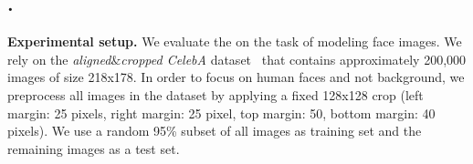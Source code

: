 \begin{table}[t]
        \center
    \caption{The negative log-likelihood of the different models for the CIFAR-10 \textbf{test set}
             measured as bits-per-dimension.}
	\label{table:nll}
\end{table}

\subsection{\PYRAMID.} 

\textbf{Experimental setup.} We evaluate the \PYRAMID on 
the task of modeling face images. We rely on the \emph{aligned$\&$cropped CelebA} 
dataset~\cite{liu2015faceattributes} that contains approximately 
200,000 images of size 218x178.
In order to focus on human faces and not background, we preprocess all images in the dataset by applying a 
fixed 128x128 crop (left margin: 25 pixels, right margin: 
25 pixel, top margin: 50, bottom margin: 40 pixels).
We use a random 95\% subset of all images as training set 
and the remaining images as a test set.



